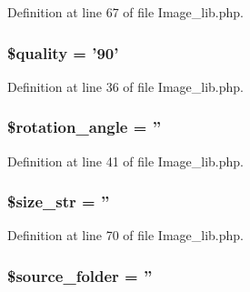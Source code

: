 Definition at line 67 of file Image\-\_\-lib.\-php.

\hypertarget{class_c_i___image__lib_a0e342ea32cccdc2c932ad23b9796a62a}{
\subsubsection[{\$quality}]{\setlength{\rightskip}{0pt plus 5cm}\$quality = '90'}}\label{class_c_i___image__lib_a0e342ea32cccdc2c932ad23b9796a62a}


Definition at line 36 of file Image\-\_\-lib.\-php.

\hypertarget{class_c_i___image__lib_a9410d2e216c0c1dd852031f2a39e7ec7}{
\subsubsection[{\$rotation\-\_\-angle}]{\setlength{\rightskip}{0pt plus 5cm}\$rotation\-\_\-angle = ''}}\label{class_c_i___image__lib_a9410d2e216c0c1dd852031f2a39e7ec7}


Definition at line 41 of file Image\-\_\-lib.\-php.

\hypertarget{class_c_i___image__lib_aff68567b98390e0db61065df80af5d49}{
\subsubsection[{\$size\-\_\-str}]{\setlength{\rightskip}{0pt plus 5cm}\$size\-\_\-str = ''}}\label{class_c_i___image__lib_aff68567b98390e0db61065df80af5d49}


Definition at line 70 of file Image\-\_\-lib.\-php.

\hypertarget{class_c_i___image__lib_a8fa5462b549251df178487f869c49800}{
\subsubsection[{\$source\-\_\-folder}]{\setlength{\rightskip}{0pt plus 5cm}\$source\-\_\-folder = ''}}\label{class_c_i___image__lib_a8fa5462b549251df178487f869c49800}


